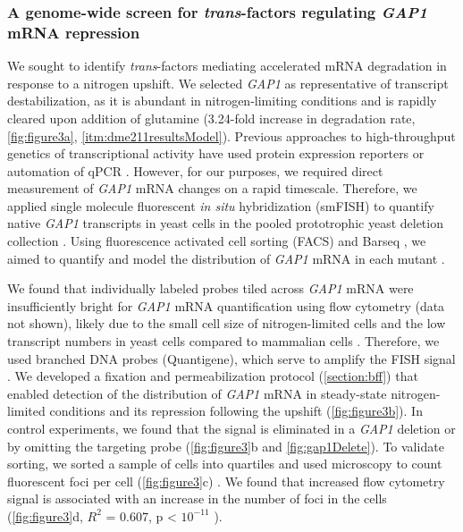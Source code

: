 \subsubsection{A genome-wide screen for \textit{trans}-factors 
  regulating \textit{GAP1} mRNA repression}

We sought to identify \textit{trans}-factors mediating accelerated mRNA
degradation in response to a nitrogen upshift. We selected \textit{GAP1} 
as representative of transcript destabilization, as it is abundant in
nitrogen-limiting conditions and is rapidly cleared upon addition of
glutamine  (3.24-fold increase in degradation rate, \autoref{fig:figure3a},
\autoref{itm:dme211resultsModel}). Previous approaches to high-throughput
genetics of transcriptional activity have used protein expression
reporters \parencite{neklesa2009genome,sliva2016barcode} or automation of qPCR 
\parencite{worley2016genome}. However, for our
purposes, we required direct measurement of \textit{GAP1} mRNA 
changes on a rapid timescale.
Therefore, we applied single molecule fluorescent \textit{in situ}
hybridization (smFISH) to quantify 
native \textit{GAP1} transcripts in yeast cells in the pooled
prototrophic yeast deletion collection \parencite{vandersluis2014broad}.
Using fluorescence activated cell sorting (FACS) and Barseq
\parencite{smith2009quantitative,robinson2014design,giaever2014yeast},
we aimed to quantify and model the distribution of \textit{GAP1} mRNA
in each mutant \parencite{kinney2010using,peterman2016sort}.



We found that
individually labeled probes tiled across \textit{GAP1} mRNA
\parencite{raj2008imaging} were insufficiently bright for
\textit{GAP1} mRNA quantification using flow cytometry (data not shown),
likely due to the small cell size of nitrogen-limited cells and the
low transcript numbers in yeast cells compared to mammalian cells
\parencite{klemm2014transcriptional}. Therefore, we used branched DNA probes
(Quantigene), which serve to amplify the FISH signal
\parencite{hanley2013detection}. We developed a fixation and permeabilization
protocol (\autoref{section:bff}) that enabled detection of the
distribution of  \textit{GAP1} mRNA in steady-state nitrogen-limited conditions
and its repression following the  upshift (\autoref{fig:figure3b}). In control
experiments, we found that the signal is eliminated in a \textit{GAP1} deletion
or by omitting the targeting probe%
(\autoref{fig:figure3}b and \autoref{fig:gap1Delete}). To validate
sorting, we sorted a sample of cells into quartiles and used
microscopy to count fluorescent foci per cell
(\autoref{fig:figure3}c) .
We found that increased flow cytometry signal is associated with an
increase in the number of foci in the cells (\autoref{fig:figure3}d, $R^2$ = 0.607,
p < $10^{-11}$ ). 

